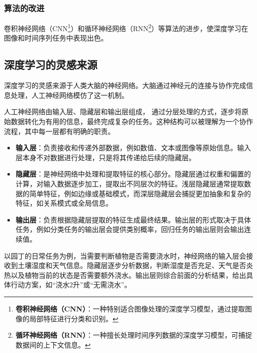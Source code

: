 \subsubsection{算法的改进}
卷积神经网络（CNN\footnote{\textbf{卷积神经网络（CNN）}：一种特别适合图像处理的深度学习模型，通过提取图像的局部特征进行分类和识别。}）和循环神经网络（RNN\footnote{\textbf{循环神经网络（RNN）}：一种擅长处理时间序列数据的深度学习模型，可捕捉数据间的上下文信息。}）等算法的进步，使深度学习在图像和时间序列任务中表现出色。

\subsection{深度学习的灵感来源}

深度学习的灵感来源于人类大脑的神经网络。大脑通过神经元的连接与协作完成信息处理，人工神经网络模仿了这一机制。



人工神经网络由输入层、隐藏层和输出层组成，
通过分层处理的方式，逐步将原始数据转化为有用的信息，最终完成复杂的任务。这种结构可以被理解为一个协作流程，其中每一层都有明确的职责。

\begin{itemize}
    \item \textbf{输入层}：负责接收和传递外部数据，例如数值、文本或图像等原始信息。输入层本身不对数据进行处理，只是将其传递给后续的隐藏层。
    \item \textbf{隐藏层}：是神经网络中处理和提取特征的核心部分。隐藏层通过权重和偏置的计算，对输入数据逐步加工，提取出不同层次的特征。浅层隐藏层通常提取数据的简单特征，例如边缘或基础模式，而深层隐藏层会捕捉更加抽象和复杂的特征，如关系模式或全局信息。
    \item \textbf{输出层}：负责根据隐藏层提取的特征生成最终结果。输出层的形式取决于具体任务，例如分类任务的输出层会提供类别概率，回归任务的输出层则会输出连续值。
\end{itemize}
以园丁的日常任务为例，当需要判断植物是否需要浇水时，神经网络的输入层会接收到土壤湿度和天气信息。隐藏层逐步分析数据，判断湿度是否充足、天气是否炎热以及植物当前的状态是否需要额外浇水。输出层则综合前面的分析结果，给出具体行动方案，如“浇水2升”或“无需浇水”。

